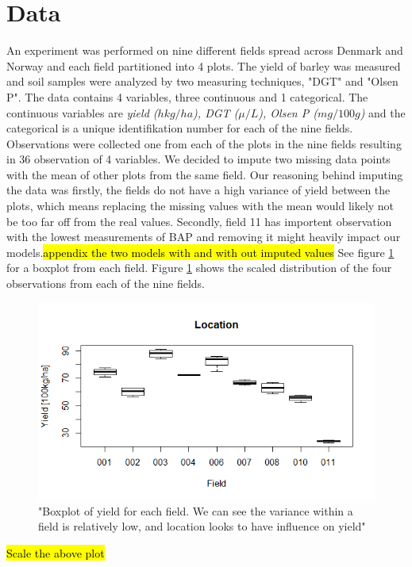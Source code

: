 \documentclass{article}
\begin{document}
\section{Data}
An experiment was performed on nine different fields spread across Denmark and Norway and each field partitioned into 4 plots. The yield of barley was measured and soil samples were analyzed by two measuring techniques, "DGT" and "Olsen P".
The data contains 4 variables, three continuous and 1 categorical. The continuous variables are \textit{yield ($hkg/ha$), DGT ($\mu/L$), Olsen P ($mg/100g$)} and the categorical is a unique identifikation number for each of the nine fields.
Observations were collected one from each of the plots in the nine fields resulting in 36 observation of 4 variables.
We decided to impute two missing data points with the mean of other plots from the same field.
Our reasoning behind imputing the data was firstly, the fields do not have a high variance of yield between the plots, which means replacing the missing values with the mean would likely not be too far off from the real values.
Secondly, field 11 has importent observation with the lowest measurements of BAP and removing it might heavily impact our models.\hl{appendix the two models with and with out imputed values} See figure \ref{fig:loc} for a boxplot from each field. Figure \ref{fig:loc} shows the scaled distribution of the four observations from each of the nine fields.
 
\begin{figure}[H]
\includegraphics[width=\linewidth]{locationYield.png}
\caption{"Boxplot of yield for each field. We can see the variance within a field is relatively low, and location looks to have influence on yield"}
\label{fig:loc}
\end{figure}
\hl{Scale the above plot}
\end{document}
